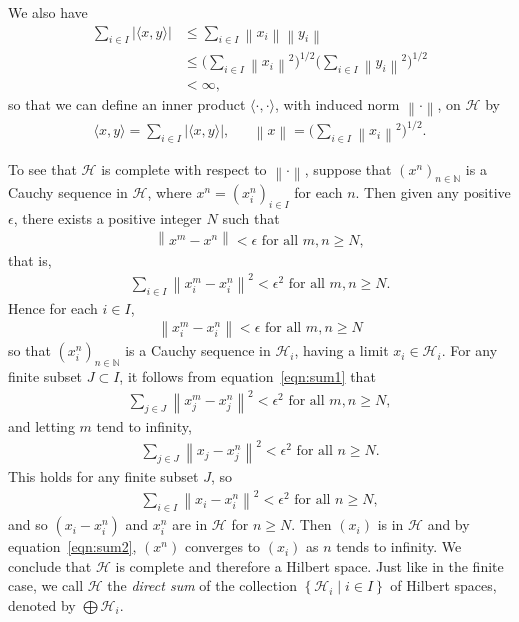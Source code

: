 \documentclass[11pt,a4paper]{report}
\theoremstyle{plain}
\theoremstyle{definition}
\newcommand{\1}{\mathbbm{1}}
\newcommand{\N}{\mathbb{N}}
\renewcommand{\H}{\mathcal{H}}
\renewcommand{\oplus}{\textstyle\bigoplus}
\begin{document}
We also have
\begin{align*}
			\sum_{i\in I}{\left|\langle x,y\rangle\right|} 
	&\leq	\sum_{i\in I}{\left\|x_i\right\|	\left\|y_i\right\|}							\\
	&\leq 	\Big(\sum_{i\in I}{\left\|x_i\right\|^2}\Big)^{1/2}
							\Big(\sum_{i\in I}{\left\|y_i\right\|^2}\Big)^{1/2}				\\
	&< \infty,
\end{align*}
so that we can define an inner product $\langle\cdot,\cdot\rangle$, with induced 
norm $\left\|\cdot\right\|$, on $\H$ by
\begin{align*}
	\langle x,y\rangle = \sum_{i\in I}{\left|\langle x,y\rangle\right|}, 
			&& \left\|x\right\| = \Big(\sum_{i\in I}{\left\|x_i\right\|^2}\Big)^{1/2}.
\end{align*}

To see that $\H$ is complete with respect to $\left\|\cdot\right\|$, suppose 
that $(x^{n})_{n\in\N}$ is a Cauchy sequence in $\H$, where $x^{n} = 
(x^n_i)_{i\in I}$ for each $n$. Then given any positive $\epsilon$, there exists 
a positive integer $N$ such that
\begin{align*}
	\left\|x^m-x^n\right\| < \epsilon \mbox{ for all } m,n\geq N,
\end{align*}
that is,
\begin{align}\label{eqn:sum1}
	\sum_{i\in I}{\left\|x^m_i-x^n_i\right\|^2} < \epsilon^2 \mbox{ for all } m,n\geq N.
\end{align}
Hence for each $i\in I$,
\begin{align*}
	\left\|x^m_i-x^n_i\right\| < \epsilon \mbox{ for all } m,n\geq N
\end{align*}
so that $(x^n_i)_{n\in\N}$ is a Cauchy sequence in $\H_i$, having a limit $x_i\in\H_i$.
For any finite subset $J\subset I$, it follows from equation~\eqref{eqn:sum1} that 
\begin{align*}
	\sum_{j\in J}{\left\|x^m_j-x^n_j\right\|^2} < \epsilon^2  \mbox{ for all } m,n\geq N,
\end{align*}
and letting $m$ tend to infinity,
\begin{align}\label{eqn:sum2}
	\sum_{j\in J}{\left\|x_j-x^n_j\right\|^2} < \epsilon^2  \mbox{ for all } n\geq N.
\end{align}
This holds for any finite subset $J$, so
\begin{align*}
	\sum_{i\in I}{\left\|x_i-x^n_i\right\|^2} < \epsilon^2  \mbox{ for all } n\geq N,
\end{align*}
and so $(x_i-x^n_i)$ and $x^n_i$ are in $\H$ for $n\geq N$. Then $(x_i)$ is in 
$\H$ and by equation~\eqref{eqn:sum2}, $(x^n)$ converges to $(x_i)$ as $n$ tends to 
infinity. We conclude that $\H$ is complete and therefore a Hilbert space. Just 
like in the finite case, we call $\H$ the \emph{direct sum} of the collection 
$\left\{\H_i \mid i\in I\right\}$ of Hilbert spaces, denoted by $\oplus\H_i$.
\end{document}
